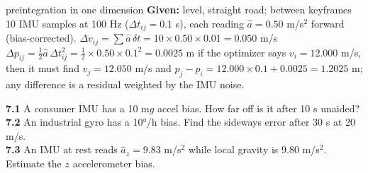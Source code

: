 \begin{worked}{preintegration in one dimension}
\textbf{Given:} level, straight road; between keyframes 10 IMU samples at 100 Hz ($\Delta t_{ij}=0.1$ s), each reading $\hat a=0.50$ m/s$^2$ forward (bias-corrected).
 $\Delta v_{ij}=\sum\hat a\,\delta t=10\times0.50\times0.01=0.050$ m/s
 $\Delta p_{ij}=\tfrac12\hat a\,\Delta t_{ij}^2=\tfrac12\times0.50\times0.1^2=0.0025$ m
 if the optimizer says $v_i=12.000$ m/s, then it must find $v_j=12.050$ m/s and $p_j-p_i=12.000\times0.1+0.0025=1.2025$ m; any difference is a residual weighted by the IMU noise.
\end{worked}

\begin{tryit}
\textbf{7.1} A consumer IMU has a 10 m$g$ accel bias. How far off is it after 10 s unaided?\\
\textbf{7.2} An industrial gyro has a 10°/h bias. Find the sideways error after 30 s at 20 m/s.\\
\textbf{7.3} An IMU at rest reads $\hat a_z=9.83$ m/s$^2$ while local gravity is 9.80 m/s$^2$. Estimate the $z$ accelerometer bias.
\end{tryit}


